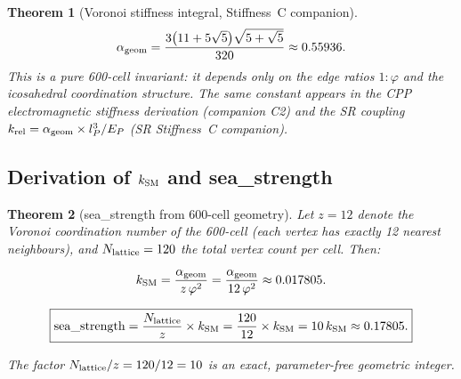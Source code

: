 \documentclass[11pt,a4paper]{article}
\newtheorem{theorem}{Theorem}[section]
\newcommand{\phig}{\varphi}
\begin{document}
\begin{theorem}[Voronoi stiffness integral, Stiffness~C companion]
\label{thm:alpha_geom}
\begin{equation}
\alpha_{\rm geom}
= \frac{3\!\left(11 + 5\sqrt{5}\right)\!\sqrt{5 + \sqrt{5}}}{320}
\approx 0.55936.
\label{eq:alpha_geom}
\end{equation}
This is a pure 600-cell invariant: it depends only on the edge
ratios $1:\phig$ and the icosahedral coordination structure.  The
same constant appears in the CPP electromagnetic stiffness derivation
(companion C2) and the SR coupling $k_{\rm rel} = \alpha_{\rm geom}
\times l_P^3 / E_P$ (SR Stiffness~C companion).
\end{theorem}

\subsection{Derivation of $k_{\rm SM}$ and sea\_strength}

\begin{theorem}[sea\_strength from 600-cell geometry]
\label{thm:sea_strength}
Let $z = 12$ denote the Voronoi coordination number of the 600-cell
(each vertex has exactly 12 nearest neighbours), and
$N_{\rm lattice} = 120$ the total vertex count per cell.  Then:

\begin{equation}
k_{\rm SM} = \frac{\alpha_{\rm geom}}{z\,\phig^2}
= \frac{\alpha_{\rm geom}}{12\,\phig^2}
\approx 0.017805.
\label{eq:k_sm}
\end{equation}

\begin{equation}
\boxed{
\mathrm{sea\_strength} = \frac{N_{\rm lattice}}{z} \times k_{\rm SM}
= \frac{120}{12} \times k_{\rm SM}
= 10\,k_{\rm SM}
\approx 0.17805.}
\label{eq:sea_strength_derived}
\end{equation}

The factor $N_{\rm lattice}/z = 120/12 = 10$ is an exact,
parameter-free geometric integer.
\end{theorem}
\end{document}
